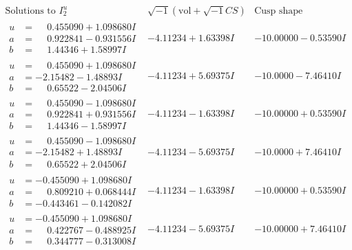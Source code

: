 \documentclass[1p]{elsarticle_modified}
\theoremstyle{definition}
\newcommand{\I}{\sqrt{-1}}
\begin{document}
$$\begin{array}{c|c|c}  
\text{Solutions to }I^u_{2}& \I (\text{vol} + \sqrt{-1}CS) & \text{Cusp shape}\\
 \hline 
\begin{aligned}
u &= \phantom{-}0.455090 + 1.098680 I \\
a &= \phantom{-}0.922841 - 0.931556 I \\
b &= \phantom{-}1.44346 + 1.58997 I\end{aligned}
 & -4.11234 + 1.63398 I & -10.00000 - 0.53590 I \\ \hline\begin{aligned}
u &= \phantom{-}0.455090 + 1.098680 I \\
a &= -2.15482 - 1.48893 I \\
b &= \phantom{-}0.65522 - 2.04506 I\end{aligned}
 & -4.11234 + 5.69375 I & -10.0000 - 7.46410 I \\ \hline\begin{aligned}
u &= \phantom{-}0.455090 - 1.098680 I \\
a &= \phantom{-}0.922841 + 0.931556 I \\
b &= \phantom{-}1.44346 - 1.58997 I\end{aligned}
 & -4.11234 - 1.63398 I & -10.00000 + 0.53590 I \\ \hline\begin{aligned}
u &= \phantom{-}0.455090 - 1.098680 I \\
a &= -2.15482 + 1.48893 I \\
b &= \phantom{-}0.65522 + 2.04506 I\end{aligned}
 & -4.11234 - 5.69375 I & -10.0000 + 7.46410 I \\ \hline\begin{aligned}
u &= -0.455090 + 1.098680 I \\
a &= \phantom{-}0.809210 + 0.068444 I \\
b &= -0.443461 - 0.142082 I\end{aligned}
 & -4.11234 - 1.63398 I & -10.00000 + 0.53590 I \\ \hline\begin{aligned}
u &= -0.455090 + 1.098680 I \\
a &= \phantom{-}0.422767 - 0.488925 I \\
b &= \phantom{-}0.344777 - 0.313008 I\end{aligned}
 & -4.11234 - 5.69375 I & -10.00000 + 7.46410 I \\ \hline\begin{aligned}

\end{aligned}
\end{array}$$
\end{document}

